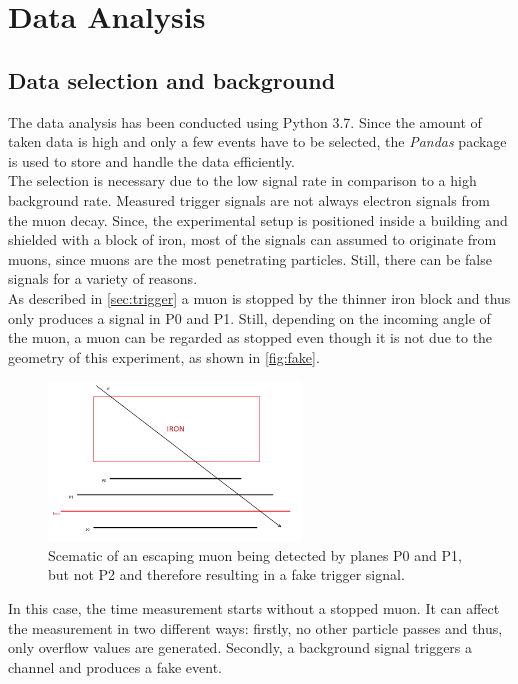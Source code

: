 \chapter{Data Analysis}
\label{sec:data_analysis}
\section{Data selection and background}
The data analysis has been conducted using Python 3.7. Since the amount of taken data is high 
and only a few events have to be selected, the \textit{Pandas} package \cite{pandas} is 
used to store and handle the data efficiently. \\

The selection is necessary due to the low signal rate in comparison to a high background rate.
Measured trigger signals are not always electron signals from the muon decay.
Since, the experimental setup is positioned inside a building and shielded with a block of iron,
 most of the signals can assumed to originate from muons, since muons are the most penetrating
particles. Still, there can be false signals for a variety of reasons. \\

As described in \autoref{sec:trigger} a muon is stopped by the thinner iron block and thus
only produces a signal in P0 and P1. Still, depending on the incoming angle of the muon,
a muon can be regarded as stopped even though it is not due to the geometry of this experiment,
as shown in \autoref{fig:fake}.

\begin{figure}
	 \centering
	 \includegraphics[width=0.6\textwidth]{figures/falsestopping.png}
	 \caption{Scematic of an escaping muon being detected by planes P0 and P1, but not P2 and therefore resulting in a fake trigger signal.}
	 \label{fig:fake}
\end{figure}

In this case, the time measurement starts without a stopped muon. It can affect the measurement in two different ways: firstly, no other particle passes and thus, only overflow values are generated. Secondly, a background signal triggers a channel and produces a fake event.\\

